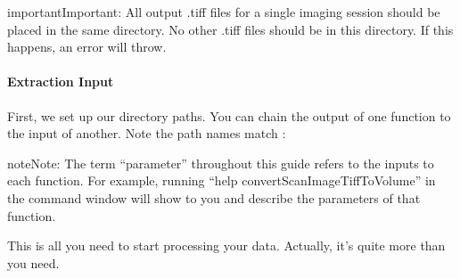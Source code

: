 \documentclass[letterpaper,10pt,english]{sphinxmanual}
\begin{document}
\begin{sphinxadmonition}{important}{Important:}
\sphinxAtStartPar
All output .tiff files for a single imaging session should be placed in the same directory.
No other .tiff files should be in this directory. If this happens, an error will throw.
\end{sphinxadmonition}


\paragraph{Extraction Input}
\label{\detokenize{user_guide/pre_processing:extraction-input}}
\sphinxAtStartPar
First, we set up our directory paths. You can chain the output of one function to the input of another. Note the path names match {\hyperref[\detokenize{get_started/getting_started:directory-structure}]{}}:

\begin{sphinxVerbatim}[commandchars=\\\{\}]
\PYG{p}{[}\PYG{p}{]}
\PYG{p}{[}\PYG{p}{]}
\end{sphinxVerbatim}

\begin{sphinxadmonition}{note}{Note:}
\sphinxAtStartPar
The term “parameter” throughout this guide refers to the inputs to each function.
For example, running “help convertScanImageTiffToVolume” in the command window will
show to you and describe the parameters of that function.
\end{sphinxadmonition}

\sphinxAtStartPar
This is all you need to start processing your data. Actually, it’s quite more than you need.
\end{document}
